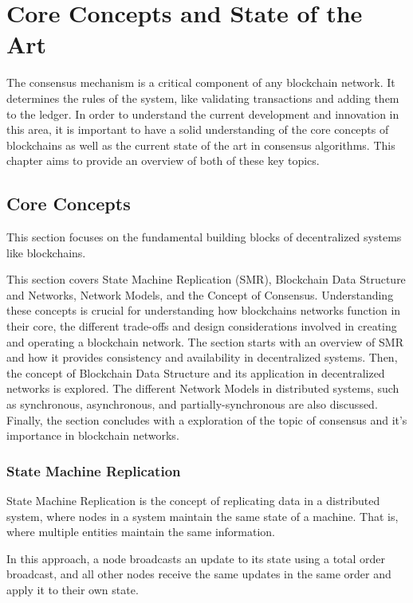\chapter{Core Concepts and State of the Art}

The consensus mechanism is a critical component of any blockchain network. It determines the rules of the system, like validating transactions and adding them to the ledger. In order to understand the current development and innovation in this area, it is important to have a solid understanding of the core concepts of blockchains as well as the current state of the art in consensus algorithms. This chapter aims to provide an overview of both of these key topics.

\section{Core Concepts}
This section focuses on the fundamental building blocks of decentralized systems like block\-chains.

This section covers State Machine Replication (SMR), Blockchain Data Structure and Networks, Network Models, and the Concept of Consensus.
Understanding these concepts is crucial for understanding how blockchains networks function in their core, the different trade-offs and design considerations involved in creating and operating a blockchain network. The section starts with an overview of SMR and how it provides consistency and availability in decentralized systems.
Then, the concept of Blockchain Data Structure and its application in decentralized networks is explored. The different Network Models in distributed systems, such as synchronous, asynchronous, and partially-synchronous are also discussed. Finally, the section concludes with a exploration of the topic of consensus and it's importance in blockchain networks.


\subsection*{\textbf{State Machine Replication}}
State Machine Replication is the concept of replicating data in a distributed system, where nodes in a system maintain the same state of a machine. That is, where multiple entities maintain the same information.

In this approach, a node broadcasts an update to its state using a total order broadcast, and all other nodes receive the same updates in the same order and apply it to their own state.

